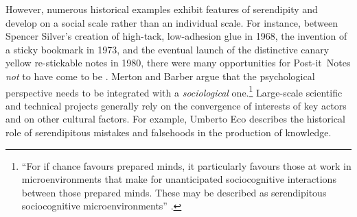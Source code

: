 However, numerous historical examples exhibit features of
serendipity and develop on a social scale rather than an individual
scale.  For instance, between Spencer Silver's creation of high-tack,
low-adhesion glue in 1968, the invention of a sticky bookmark in 1973,
and the eventual launch of the distinctive canary yellow re-stickable
notes in 1980, there were many opportunities for
Post-it\texttrademark\ Notes \emph{not} to have come to be
\cite{tce-postits}.  Merton and Barber argue that the
psychological perspective needs to be integrated with a
\emph{sociological} one.\footnote{ ``For if chance favours prepared
  minds, it particularly favours those at work in microenvironments
  that make for unanticipated sociocognitive interactions between
  those prepared minds. These may be described as serendipitous
  sociocognitive microenvironments'' \cite[p. 259--260]{merton}.}
Large-scale scientific and technical projects generally rely on the
convergence of interests of key actors and on other cultural factors.
For example, Umberto Eco \citeyear{eco2013serendipities} describes the
historical role of serendipitous mistakes and falsehoods in the
production of knowledge.

